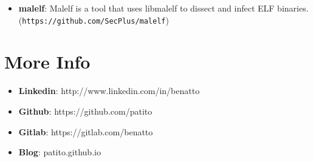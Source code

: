 \documentclass[margin]{res}
\begin{document}
\begin{resume}
\begin{itemize}
		    \item \textbf{malelf}: Malelf is a tool that uses libmalelf to dissect and infect ELF binaries. 
		                           (\texttt{https://github.com/SecPlus/malelf})
		\end{itemize}
 
\section{More Info}
    \begin{itemize}
        \item \textbf{Linkedin}: http://www.linkedin.com/in/benatto
        \item \textbf{Github}: https://github.com/patito
        \item \textbf{Gitlab}: https://gitlab.com/benatto
        \item \textbf{Blog}: patito.github.io
    \end{itemize}


\end{resume} 
\end{document}
